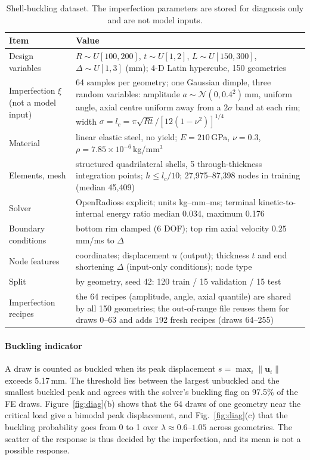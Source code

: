 \documentclass[preprint,12pt]{elsarticle}
\newcommand{\N}{\mathcal{N}}
\begin{document}
\begin{table}[!htbp]
\centering
\footnotesize
\begin{tabularx}{\textwidth}{@{}l Y@{}}
\toprule
Item & Value \\
\midrule
Design variables & $R\sim U[100,200]$, $t\sim U[1,2]$, $L\sim U[150,300]$, $\Delta\sim U[1,3]$ (mm); 4-D Latin hypercube, 150 geometries \\
Imperfection $\xi$ (not a model input) & 64 samples per geometry; one Gaussian dimple, three random variables: amplitude $a\sim\N(0,0.4^2)$\,mm, uniform angle, axial centre uniform away from a $2\sigma$ band at each rim; width $\sigma=l_c=\pi\sqrt{Rt}/[12(1-\nu^2)]^{1/4}$ \\
Material & linear elastic steel, no yield; $E=210$\,GPa, $\nu=0.3$, $\rho=7.85\times10^{-6}$\,kg/mm$^3$ \\
Elements, mesh & structured quadrilateral shells, 5 through-thickness integration points; $h\le l_c/10$; 27,975--87,398 nodes in training (median 45,409) \\
Solver & OpenRadioss explicit; units kg--mm--ms; terminal kinetic-to-internal energy ratio median 0.034, maximum 0.176 \\
Boundary conditions & bottom rim clamped (6 DOF); top rim axial velocity $0.25$\,mm/ms to $\Delta$ \\
Node features & coordinates; displacement $u$ (output); thickness $t$ and end shortening $\Delta$ (input-only conditions); node type \\
Split & by geometry, seed 42: 120 train / 15 validation / 15 test \\
Imperfection recipes & the 64 recipes (amplitude, angle, axial quantile) are shared by all 150 geometries; the out-of-range file reuses them for draws 0--63 and adds 192 fresh recipes (draws 64--255) \\
\bottomrule
\end{tabularx}
\caption{Shell-buckling dataset. The imperfection parameters are stored for diagnosis only and
are not model inputs.}
\label{tab:dataset}
\end{table}

\paragraph{Buckling indicator} A draw is counted as buckled when its peak displacement
$s=\max_i\|\mathbf{u}_i\|$ exceeds 5.17\,mm. The threshold lies between the largest unbuckled and
the smallest buckled peak and agrees with the solver's buckling flag on 97.5\% of the FE draws.
Figure~\ref{fig:diag}(b) shows that the 64 draws of one geometry near the critical load give a
bimodal peak displacement, and Fig.~\ref{fig:diag}(c) that the buckling probability goes from 0 to
1 over $\lambda\approx0.6$--$1.05$ across geometries. The scatter of the response is thus decided
by the imperfection, and its mean is not a possible response.
\end{document}
